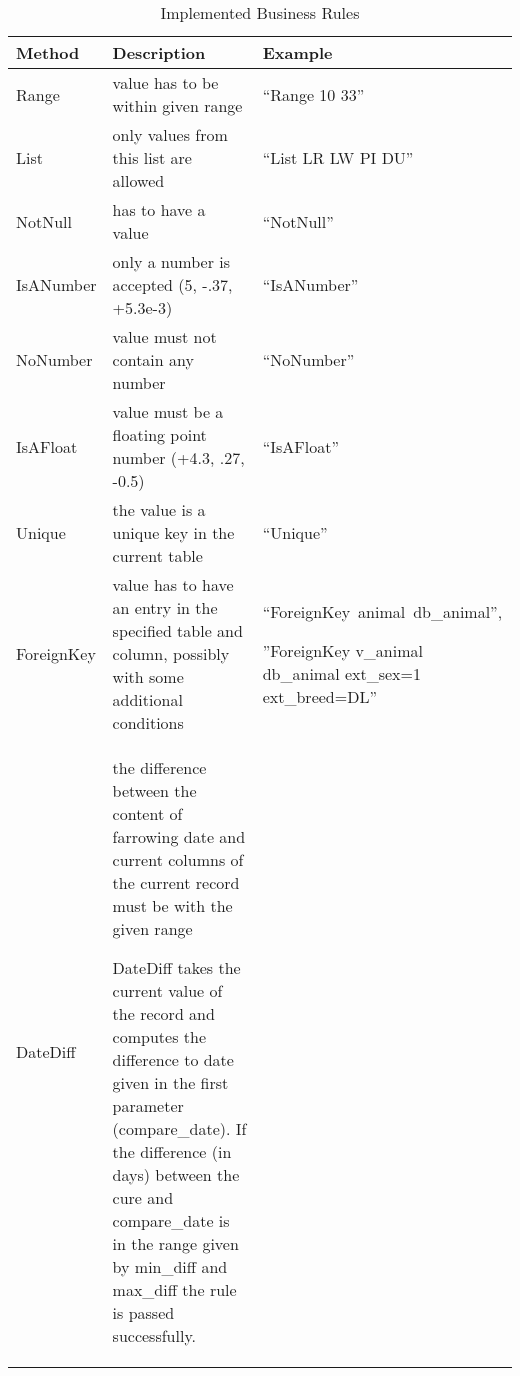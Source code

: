 \begin{table}[htbp]

\caption{Implemented Business Rules\label{tab:business rules}}

\begin{center}{\small \vspace*{4mm}}\begin{sideways}
\begin{tabular}{|l|p{100mm}|p{50mm}|}
\hline 
\textbf{\small Method}&
\textbf{\small Description}&
\textbf{\small Example}\tabularnewline
\hline
\hline 
{\small Range}&
{\small value has to be within given range}&
{\small {}``Range 10 33''}\tabularnewline
\hline
{\small List}&
{\small only values from this list are allowed}&
{\small {}``List LR LW PI DU''}\tabularnewline
\hline
{\small NotNull}&
{\small has to have a value}&
{\small {}``NotNull''}\tabularnewline
\hline
{\small IsANumber}&
{\small only a number is accepted (5, -.37, +5.3e-3)}&
{}``IsANumber''\tabularnewline
\hline
{\small NoNumber}&
value must not contain any number &
{}``NoNumber''\tabularnewline
\hline
{\small IsAFloat}&
{\small value must be a floating point number (+4.3, .27, -0.5)}&
{}``IsAFloat''\tabularnewline
\hline
{\small Unique}&
{\small the value is a unique key in the current table}&
{\small {}``Unique''}\tabularnewline
\hline
{\small ForeignKey}&
{\small value has to have an entry in the specified table and column,
possibly with some additional conditions}&
{\small \mbox{{}``ForeignKey animal db\_animal'',}}{\small \par}

{\small ''ForeignKey v\_animal db\_animal ext\_sex=1 ext\_breed=DL''}\tabularnewline
\hline
{\small DateDiff}&
{\small the difference between the content of farrowing date and current
columns of the current record must be with the given range}{\small \par}

{\small DateDiff takes the current value of the record and computes
the difference to date given in the first parameter (compare\_date).
If the difference (in days) between the cure and compare\_date is
in the range given by min\_diff and max\_diff the rule is passed successfully. }{\small \par}


\end{tabular}
\end{sideways}
\end{center}
\end{table}
